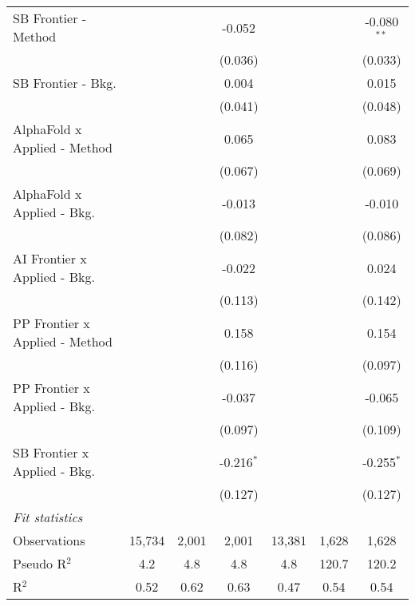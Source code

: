 \begin{tabular}{lcccccc}
   SB Frontier - Method           &               &             & -0.052       &               &               & -0.080$^{**}$\\   
                                  &               &             & (0.036)      &               &               & (0.033)\\   
   SB Frontier - Bkg.             &               &             & 0.004        &               &               & 0.015\\   
                                  &               &             & (0.041)      &               &               & (0.048)\\   
   AlphaFold x Applied - Method   &               &             & 0.065        &               &               & 0.083\\   
                                  &               &             & (0.067)      &               &               & (0.069)\\   
   AlphaFold x Applied - Bkg.     &               &             & -0.013       &               &               & -0.010\\   
                                  &               &             & (0.082)      &               &               & (0.086)\\   
   AI Frontier x Applied - Bkg.   &               &             & -0.022       &               &               & 0.024\\   
                                  &               &             & (0.113)      &               &               & (0.142)\\   
   PP Frontier x Applied - Method &               &             & 0.158        &               &               & 0.154\\   
                                  &               &             & (0.116)      &               &               & (0.097)\\   
   PP Frontier x Applied - Bkg.   &               &             & -0.037       &               &               & -0.065\\   
                                  &               &             & (0.097)      &               &               & (0.109)\\   
   SB Frontier x Applied - Bkg.   &               &             & -0.216$^{*}$ &               &               & -0.255$^{*}$\\   
                                  &               &             & (0.127)      &               &               & (0.127)\\   
   \midrule
   \emph{Fit statistics}\\
   Observations                   & 15,734        & 2,001       & 2,001        & 13,381        & 1,628         & 1,628\\  
   Pseudo R$^2$                   & 4.2           & 4.8         & 4.8          & 4.8           & 120.7         & 120.2\\  
   R$^2$                          & 0.52          & 0.62        & 0.63         & 0.47          & 0.54          & 0.54\\  
   

\end{tabular}
